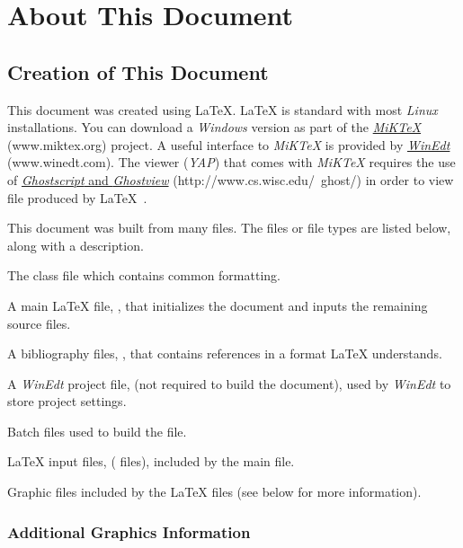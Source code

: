 \chapter*{About This Document}


\section*{Creation of This Document}

This document was created using \LaTeX{}\@.  \LaTeX{} is standard with most \emph{Linux} installations. You can download a \emph{Windows} version as part of the \href{http://www.miktex.org/}{\emph{MiKTeX}} (www.miktex.org) project. A useful interface to \emph{MiKTeX} is provided by \href{http://www.winedt.com/}{\emph{WinEdt}}  (www.winedt.com). The  viewer (\emph{YAP}) that comes with \emph{MiKTeX} requires the use of \href{http://www.cs.wisc.edu/~ghost/}{\emph{Ghostscript} and \emph{Ghostview}} (http://www.cs.wisc.edu/~ghost/)  in order to view  file produced by \LaTeX{}~\cite{ref:kopka1999a}.

This document was built from many files.  The files or file types are listed below, along with a description.
\begin{bulletedlist}
	\item The class file  which contains common formatting.
	\item A main \LaTeX{} file, , that initializes the document and inputs the remaining source files.
	\item A bibliography files, , that contains references in a format \LaTeX{} understands.
	\item A \emph{WinEdt} project file,  (not required to build the document), used by \emph{WinEdt} to store project settings.
    \item Batch files used to build the file.
	\item \LaTeX{} input files, ( files), included by the main file.
	\item Graphic files included by the \LaTeX{} files (see below for more information).
\end{bulletedlist}

\subsection*{Additional Graphics Information}


